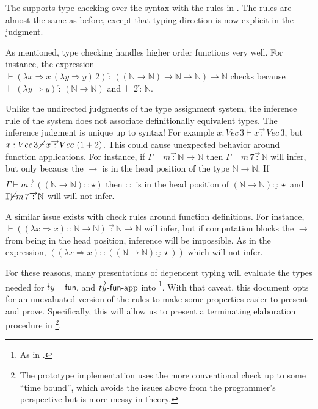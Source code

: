 The \slang{} supports \bidir{} type-checking over the syntax with the rules in .
The rules are almost the same as before, except that typing direction is now explicit in the judgment.
 
As mentioned, \bidir{} type checking handles higher order functions very well.
For instance, the expression $\vdash(\lambda x\Rightarrow x\,(\lambda y\Rightarrow y)\,2)\overleftarrow{\,:\,}\left(\left(\mathbb{N}\rightarrow\mathbb{N}\right)\rightarrow\mathbb{N}\rightarrow\mathbb{N}\right)\rightarrow\mathbb{N}$ checks because $\vdash(\lambda y\Rightarrow y)\overleftarrow{\,:\,}\left(\mathbb{N}\rightarrow\mathbb{N}\right)$ and $\vdash2\overleftarrow{\,:\,}\mathbb{N}$.
 
Unlike the undirected judgments of the type assignment system, the inference rule of the \bidir{} system does not associate definitionally equivalent types.
The inference judgment is unique up to syntax!
For example $x:Vec\,3\vdash x\overrightarrow{\,:\,}Vec\,3$, but $x:Vec\,3\, \cancel{\vdash}\, x\overrightarrow{\,:\,}Vec\,\left(1+2\right)$.
This could cause unexpected behavior around function applications.
For instance, if $\Gamma\vdash m\overrightarrow{\,:\,}\mathbb{N}\rightarrow\mathbb{N}$ then $\Gamma\vdash m\,7\overrightarrow{\,:\,}\mathbb{N}$ will infer, but only because the $\rightarrow$ is in the head position of the type $\mathbb{N}\underline{\rightarrow}\mathbb{N}$.
If $\Gamma\vdash m\overrightarrow{\,:\,}\left((\mathbb{N}\rightarrow\mathbb{N})::\star\right)$ then $::$ is in the head position of $(\mathbb{N}\rightarrow\mathbb{N})\underline{::}\star$ and $\Gamma\cancel{\vdash}m\,7\overrightarrow{\,:\,}\mathbb{N}$ will will not infer.
 
A similar issue exists with check rules around function definitions.
For instance, $\vdash\left((\lambda x\Rightarrow x)::\mathbb{N}\rightarrow\mathbb{N}\right)\ \overrightarrow{\,:\,}\mathbb{N}\rightarrow\mathbb{N}$ will infer, but if computation blocks the $\rightarrow$ from being in the head position, inference will be impossible.
As in the expression, $\left((\lambda x\Rightarrow x)::\left((\mathbb{N}\rightarrow\mathbb{N})\underline{::}\star\right)\right)$ which will not infer.
 
For these reasons, many presentations of \bidir{} dependent typing will evaluate the types needed for $\overleftarrow{ty}-\mathsf{fun}$, and $\operatorname{\overrightarrow{ty}-\mathsf{fun}-app}$ into \whnf{}\footnote{
  As in \cite{COQUAND1996167}.
}.
With that caveat, this document opts for an unevaluated version of the rules to make some properties easier to present and prove.
Specifically, this will allow us to present a terminating elaboration procedure in \footnote{
 The prototype implementation uses the more conventional \whnf{} check up to some ``time bound'', which avoids the issues above from the programmer's perspective but is more messy in theory.
}.

